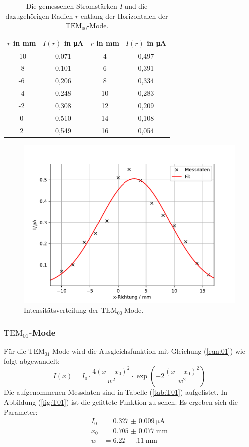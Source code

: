  \begin{table}
 	\centering
 	\caption{Die gemessenen Stromstärken $I$ und die dazugehörigen Radien $r$ entlang der Horizontalen der $\mathrm{TEM}_\mathrm{00}$-Mode.}
 	\label{tab:T00}
  \begin{tabular}{c c c c}
    \toprule
    $r$ in mm & $I(r)$ in \si{\micro\ampere} & $r$ in mm & $I(r)$ in \si{\micro\ampere} \\
    \midrule
     -10 & 0,071 & 4 & 0,497 \\
     -8 & 0,101 & 6 & 0,391 \\
     -6 & 0,206 & 8 & 0,334 \\
     -4 & 0,248 & 10 & 0,283 \\
     -2 & 0,308 & 12 & 0,209 \\
     0 & 0,510 & 14 & 0,108 \\
     2 & 0,549 & 16 & 0,054 \\
    \bottomrule
  \end{tabular}
 \end{table}

\begin{figure}[h!]
  \centering
  \includegraphics[scale=0.7]{fig/plot2.pdf}
  \caption{Intensitätsverteilung der $\mathrm{TEM}_\mathrm{00}$-Mode.}
  \label{fig:T00}
\end{figure}
\FloatBarrier
\subsubsection{$\mathrm{TEM}_\mathrm{01}$-Mode}
Für die $\text{TEM}_{01}$-Mode wird die Ausgleichsfunktion mit Gleichung (\ref{eqn:01}) wie folgt abgewandelt:
\begin{equation}
  I(x) = I_\mathrm{0} \cdot \dfrac{4(x-x_\mathrm{0})^2}{w^2} \cdot \exp\left(-2\frac{(x-x_\mathrm{0})^2}{w^2}\right)
\end{equation}
Die aufgenommenen Messdaten sind in Tabelle (\ref{tab:T01}) aufgelistet.
In Abbildung (\ref{fig:T01}) ist die gefittete Funktion zu sehen.
Es ergeben sich die Parameter:
\begin{align*}
I_\mathrm{0} &= \SI{0.327(9)}{\micro\ampere}\\
x_\mathrm{0} &= \SI{0.705(77)}{\milli\meter}\\
w &= \SI{6.22(11)}{\milli\meter}
\end{align*}

